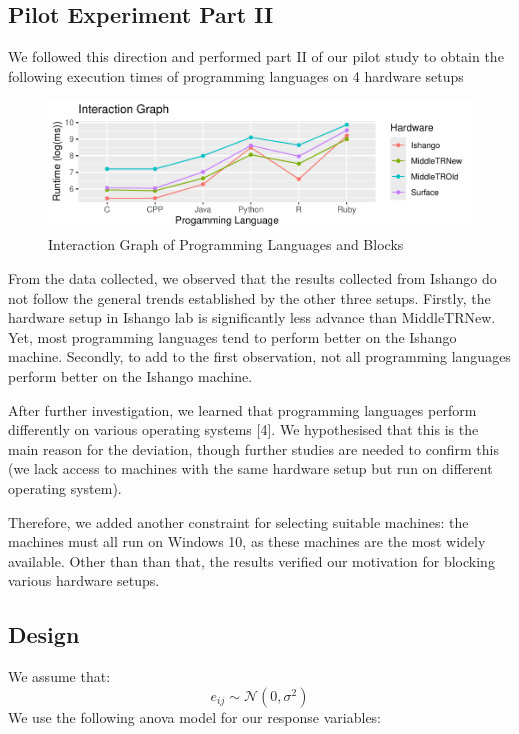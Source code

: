 \documentclass[12pt,halfline,a4paper,]{ouparticle}
\begin{document}
\subsection{Pilot Experiment Part II}\label{pilot-experiment-part-ii}

We followed this direction and performed part II of our pilot study to
obtain the following execution times of programming languages on 4
hardware setups

\begin{figure}[H]
\includegraphics[width=1\linewidth]{backup_files/figure-latex/figPilot-1} \caption{Interaction Graph of Programming Languages and Blocks}\label{fig:figPilot}
\end{figure}

From the data collected, we observed that the results collected from
Ishango do not follow the general trends established by the other three
setups. Firstly, the hardware setup in Ishango lab is significantly less
advance than MiddleTRNew. Yet, most programming languages tend to
perform better on the Ishango machine. Secondly, to add to the first
observation, not all programming languages perform better on the Ishango
machine.

After further investigation, we learned that programming languages
perform differently on various operating systems {[}4{]}. We
hypothesised that this is the main reason for the deviation, though
further studies are needed to confirm this (we lack access to machines
with the same hardware setup but run on different operating system).

Therefore, we added another constraint for selecting suitable machines:
the machines must all run on Windows 10, as these machines are the most
widely available. Other than than that, the results verified our
motivation for blocking various hardware setups.

\subsection{Design}\label{design}

We assume that: \[
e_{ij} \sim \mathcal{N}(0, \sigma^2)
\] We use the following anova model for our response variables:
\end{document}
